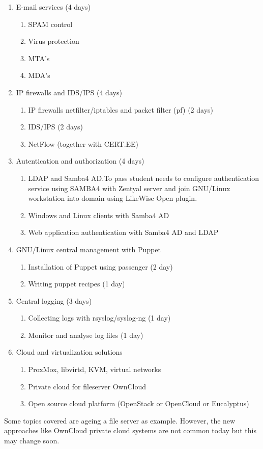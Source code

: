  
 \begin{enumerate}
   \item E-mail services (4 days)
    \begin{enumerate}[label=LAB \arabic*.,leftmargin=*]
  		\item SPAM control
	  	\item Virus protection
  		\item MTA's 
	  	\item MDA's
    \end{enumerate}
    \item IP firewalls and IDS/IPS (4 days)
        \begin{enumerate}[label=LAB \arabic*.,leftmargin=*]
  		\item IP firewalls netfilter/iptables and packet filter (pf) (2 days)
	  	\item IDS/IPS (2 days)
  		\item NetFlow (together with CERT.EE)
		\end{enumerate}
    \item Autentication and authorization (4 days)
        \begin{enumerate}[label=LAB \arabic*.,leftmargin=*]
  		\item LDAP and Samba4 AD.To pass student needs to configure authentication service using SAMBA4 with Zentyal server and join GNU/Linux workstation into domain using LikeWise Open plugin.
	  	\item Windows and Linux clients with Samba4 AD 
  		\item Web application authentication with Samba4 AD and LDAP
    		\end{enumerate}
    \item GNU/Linux central management with Puppet
        \begin{enumerate}[label=LAB \arabic*.,leftmargin=*]
	  		\item Installation of Puppet using passenger (2 day)
		  	\item Writing puppet recipes (1 day)
    		\end{enumerate}
    	\item Central logging (3 days)
    	    \begin{enumerate}[label=LAB \arabic*.,leftmargin=*]
	  		\item Collecting logs with rsyslog/syslog-ng (1 day)
		  	\item Monitor and analyse log files (1 day)
    		\end{enumerate}
    		\item Cloud and virtualization solutions
    		\begin{enumerate}[label=LAB \arabic*.,leftmargin=*]
	  		\item ProxMox, libvirtd, \gls{KVM}, virtual networks
		  	\item Private cloud for fileserver OwnCloud
		  	\item Open source cloud platform (OpenStack or OpenCloud or Eucalyptus)
    		\end{enumerate}
 \end{enumerate}

Some topics covered are ageing a file server as example. However, the new approaches like OwnCloud private cloud systems are not common today but this may change soon.



%